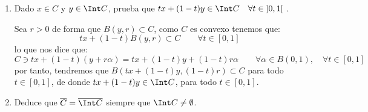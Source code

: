 \begin{ejercicio}
\begin{enumerate}[label=\alph*)]
\begin{itemize}
\begin{description}
\begin{equation*}
                                z = x + r\left(\frac{z-x}{r}\right) \quad \text{con} \quad \left\|\frac{z-x}{r}\right\| <1
                            \end{equation*}
                    \end{description}
                    Para ver:
                    \begin{equation*}
                        tB(x,r) + (1-t)B(y,r) = B(tx+(1-t)y,r)
                    \end{equation*}
                    \begin{description}
                        \item [$\subseteq )$] Si tomamos $z\in tB(x,r)+(1-t)B(y,r)$, tenemos entonces que existen $\alpha\in B(x,r)$ y $\beta\in B(y,r)$ de forma que:
                            \begin{equation*}
                                z = t(x+r\alpha) + (1-t)(y+r\beta) = tx+ (1-t)y +r(t\alpha+(1-t)\beta)
                            \end{equation*}
                            y como $t\alpha+(1-t)\beta\in B(0,1)$ por ser convexa, hemos probado que $z\in B(tx+(1-t)y,r)$.
                        \item [$\supseteq )$] Si tomamos ahora $z\in B(tx+(1-t)y,r)$, tenemos que existe un elemento $\alpha\in B(0,1)$ de forma que:
                            \begin{align*}
                                z &= tx +(1-t)y+r\alpha = tx + (1-t)y + tr\alpha + (1-t)r\alpha \\ &= t(x+r\alpha) + (1-t)(y+r\alpha) \in tB(x,r)+ (1-t)B(y,r)
                            \end{align*}
                    \end{description}
            \end{itemize}
        \item Dado $x\in C$ y $y\in \Int C$, prueba que $tx+(1-t)y\in \Int C\quad \forall t\in \left]0,1\right[$ .

            Sea $r>0$ de forma que $B(y,r)\subset C$, como $C$ es convexo tenemos que:
            \begin{equation*}
                tx+(1-t)B(y,r)\subset C \qquad \forall t\in [0,1]
            \end{equation*}
            lo que nos dice que:
            \begin{equation*}
                C\ni tx + (1-t)(y+r\alpha) = tx + (1-t)y + (1-t)r\alpha \qquad \forall \alpha\in B(0,1), \quad \forall t\in [0,1]
            \end{equation*}
            por tanto, tendremos que $B(tx+(1-t)y,(1-t)r)\subset C$ para todo $t\in [0,1]$, de donde $tx+(1-t)y\in \Int C$, para todo $t\in [0,1]$.
        \item Deduce que $\overline{C} = \overline{\Int C}$ siempre que $\Int C\neq \emptyset $.


\end{enumerate}
\end{ejercicio}
